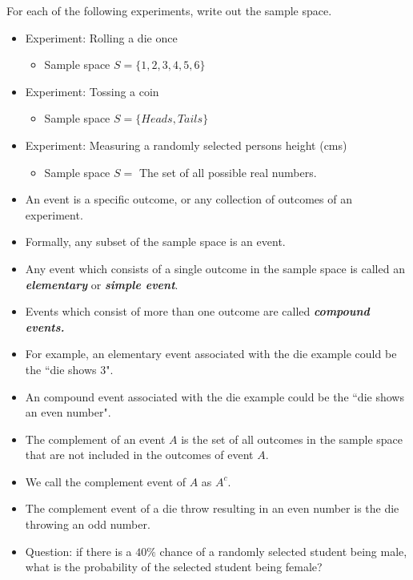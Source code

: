 \documentclass[12pt]{report}
\begin{document}
{ \Large
	For each of the following experiments, write out the sample space.
	\begin{itemize}
		\item Experiment: Rolling a die once
		\begin{itemize}
			\item Sample space $S = \{1,2,3,4,5,6\}$
		\end{itemize}
		\item Experiment: Tossing a coin
		\begin{itemize}
			\item Sample space $S = \{ Heads , Tails\}$
		\end{itemize}
		\item Experiment: Measuring a randomly selected persons height (cms)
		\begin{itemize}
			\item Sample space $S =$ The set of all possible real numbers.
		\end{itemize}
	\end{itemize}
}
{ \Large
	
	\begin{itemize} \item An event is a specific outcome, or any collection of outcomes of an
		experiment.
		\item Formally, any subset of the sample space is an event.
		\item Any event which consists of a single outcome in the sample space is
		called an \textbf{\emph{elementary}} or \textbf{\emph{simple event}}.
		\item Events which consist of more than one outcome are called \textbf{\emph{compound
				events.}}
		\item For example, an elementary event associated with the die example could
		be the ``die shows 3".
		\item An compound event associated with the die example could be the ``die
		shows an even number".
	\end{itemize}
}
{ \Large
	
	\begin{itemize} 
		
		\item The complement of an event $A$ is the set of all outcomes in the sample
		space that are not included in the outcomes of event $A$.
		\item We call the complement event of $A$ as $A^c$.
		\item The complement event of a die throw resulting in an even number is the
		die throwing an odd number.
		\item Question: if there is a $40\%$ chance of a randomly selected student being male, what is the probability of the selected student being female?
	\end{itemize}
}
\end{document}
